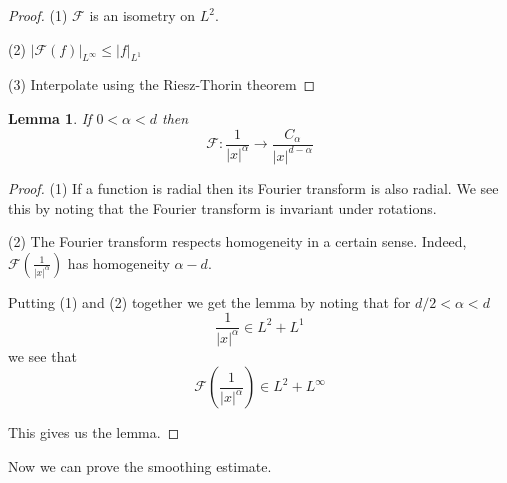 \documentclass[11pt]{amsart}
\theoremstyle{plain}
\numberwithin{equation}{section}
\newtheorem{lemm}[thm]{Lemma}
\theoremstyle{remark}
\begin{document}
\begin{proof}

(1) $\mathcal{F}$ is an isometry on $L^2$.

(2) $|\mathcal{F} (f)|_{L^\infty} \leq |f|_{L^1}$

(3) Interpolate using the Riesz-Thorin theorem

\end{proof}

\begin{lemm}
If $0<\alpha<d$ then $$\mathcal{F} : \frac{1}{|x|^\alpha} \rightarrow \frac{C_\alpha}{|x|^{d-\alpha}}$$
\end{lemm}

\begin{proof}

(1) If a function is radial then its Fourier transform is also radial. We see this by noting that the Fourier transform is invariant under rotations. 

(2) The Fourier transform respects homogeneity in a certain sense. Indeed, $\mathcal{F}(\frac{1}{|x|^\alpha})$ has homogeneity $\alpha-d.$

Putting (1) and (2) together we get the lemma by noting that for $d/2<\alpha<d$ $$\frac{1}{|x|^{\alpha}} \in L^2 + L^1$$ we see that $$\mathcal{F} (\frac{1}{|x|^{\alpha}}) \in L^2 + L^\infty$$

This gives us the lemma. 

\end{proof}

Now we can prove the smoothing estimate. 
\end{document}
